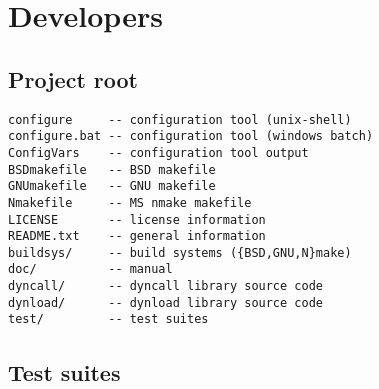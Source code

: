 %
%
%
%

\newpage
\section{Developers}

\subsection{Project root}
\begin{verbatim}
configure     -- configuration tool (unix-shell)
configure.bat -- configuration tool (windows batch)
ConfigVars    -- configuration tool output
BSDmakefile   -- BSD makefile
GNUmakefile   -- GNU makefile
Nmakefile     -- MS nmake makefile
LICENSE       -- license information
README.txt    -- general information
buildsys/     -- build systems ({BSD,GNU,N}make)
doc/          -- manual
dyncall/      -- dyncall library source code
dynload/      -- dynload library source code
test/         -- test suites
\end{verbatim}

\subsection{Test suites}

